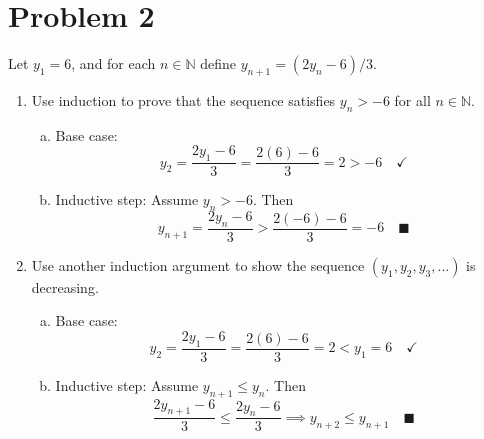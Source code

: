 \documentclass[12pt]{article}
\newcommand{\N}{\mathbb{N}}
\newcommand{\qed}{\quad \blacksquare}
\begin{document}
\section*{Problem 2}
    Let $y_1 = 6$, and for each $n \in \N$ define $y_{n+1} = (2y_n - 6)/3.$
    \begin{enumerate}
        \item Use induction to prove that the sequence satisfies $y_n > -6$ for all $n \in \N.$
            
            \color{blue}
                \begin{enumerate}[(a)]
                    \item Base case: 
                    \[y_2 = \frac{2y_1 - 6}{3} = \frac{2(6) - 6}{3} = 2 > -6 \quad \checkmark\]

                    \item Inductive step: Assume $y_n > -6$. Then 
                    \[y_{n+1} = \frac{2y_n - 6}{3} > \frac{2(-6) - 6}{3} = -6 \qed\]

                \end{enumerate}
            \color{black}

        \item Use another induction argument to show the sequence $(y_1, y_2, y_3, \dots)$ is decreasing.
            \color{blue}
                \begin{enumerate}[(a)]
                    \item Base case: 
                        \[y_2 = \frac{2y_1 - 6}{3} = \frac{2(6) - 6}{3} = 2 < y_1 = 6 \quad \checkmark\]

                    \item Inductive step: Assume $y_{n+1} \leq y_n$. Then 
                    \[\frac{2y_{n+1} - 6}{3} \leq \frac{2y_n - 6}{3} \implies y_{n+2} \leq y_{n+1} \qed\]
                \end{enumerate}
            \color{black}

    \end{enumerate}

\pagebreak 
\end{document}
